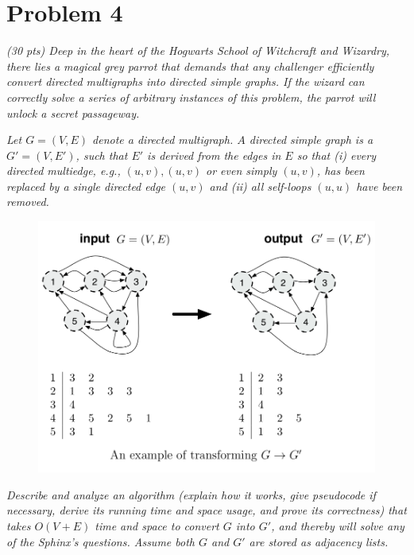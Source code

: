 \documentclass[12pt]{article} \setlength{\oddsidemargin}{0in}
\begin{document}
\newpage
\section*{Problem 4}

\textit{(30 pts) Deep in the heart of the Hogwarts School of
  Witchcraft and Wizardry, there lies a magical grey parrot that
  demands that any challenger efficiently convert directed multigraphs
  into directed simple graphs. If the wizard can correctly solve a
  series of arbitrary instances of this problem, the parrot will
  unlock a secret passageway.}

\textit{Let $G = (V,E)$ denote a directed multigraph. $A$ directed
  simple graph is a $G' = (V, E')$, such that $E'$ is derived from the
  edges in $E$ so that (i) every directed multiedge, e.g.,
  ${(u, v), (u, v)}$ or even simply ${(u, v)}$, has been replaced by a
  single directed edge ${(u, v)}$ and (ii) all self-loops $(u, u)$
  have been removed.}

\begin{figure}[h]
  \centering \includegraphics[width=1\textwidth]{P4}
\end{figure}

\textit{Describe and analyze an algorithm (explain how it works, give
  pseudocode if necessary, derive its running time and space usage,
  and prove its correctness) that takes $O(V + E)$ time and space to
  convert $G$ into $G'$, and thereby will solve any of the Sphinx’s
  questions. Assume both $G$ and $G'$ are stored as adjacency lists.}
\end{document}
